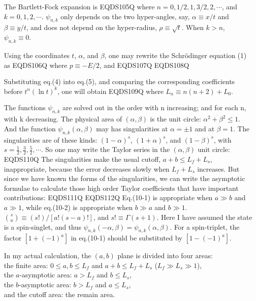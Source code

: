 \vspace{3mm}
The Bartlett-Fock expansion is
 EQDS105Q 
where $n=0, 1/2, 1, 3/2, 2, \cdots$, and $k=0, 1, 2, \cdots$.
$\psi_{n,k}$ only depends on the two hyper-angles, say,
$\alpha\equiv x/t$ and $\beta\equiv y/t$, and does not depend
on the hyper-radius, $\rho\equiv\sqrt{t}$. When $k>n$, 
$\psi_{n,k}\equiv 0$.

Using the coordinates $t$, $\alpha$, and $\beta$, one may rewrite
the Schr\"{o}dinger equation (1) as
 EQDS106Q 
where $p\equiv -E/2$, and
 EQDS107Q 
 EQDS108Q 

Substituting eq.(4) into eq.(5), and comparing the corresponding coefficients
before $t^{n}(\ln t)^k$, one will obtain
 EQDS109Q 
where $L_{n}\equiv n(n+2)+L_{0}$.

The functions $\psi_{n,k}$ are solved out in the order
with n increasing; and for each n, with k decreasing. The physical
area of $(\alpha, \beta)$ is the unit circle: $\alpha^{2}+\beta^{2}\le 1$.
And the function $\psi_{n,k}(\alpha,\beta)$ may has singularities at
$\alpha=\pm 1$ and at $\beta=1$. The singularities are of these kinds:
$(1-\alpha)^{s}$, $(1+\alpha)^{s}$, and $(1-\beta)^{s}$, with
$s=\frac{1}{2}, \frac{3}{2}, \frac{5}{2}, \cdots$. So one may write
the Taylor series in the $(\alpha,\beta)$ unit circle:
 EQDS110Q 
The singularities make the usual cutoff, $a+b\le L_f+L_s$, inappropriate, because
the error decreases slowly when $L_f+L_s$ increases.
But since we have known the forms of the singularities, we can write the
asymptotic formulae to calculate those high order Taylor coefficients that
have important contributions:
 EQDS111Q 
 EQDS112Q 
Eq.(10-1) is appropriate when $a\gg b$ and $a\gg 1$,
while eq.(10-2) is appropriate when $b\gg a$ and $b\gg 1$.
${s \choose a}\equiv(s!)/[a!(s-a)!]$, and $s!\equiv\Gamma(s+1)$.
Here I have assumed the state is a spin-singlet, and thus
$\psi_{n,k}(-\alpha,\beta)=\psi_{n,k}(\alpha,\beta)$. For a spin-triplet,
the factor $[1+(-1)^{a}]$ in eq.(10-1) should be substituted by
$[1-(-1)^{a}]$.

In my actual calculation, the $(a,b)$ plane is divided into four areas:\\
the finite area: $0\le a,b\le L_f$ and $a+b\le L_{f}+L_{s}$ ($L_f\gg L_s\gg 1$),\\
the $a$-asymptotic area: $a>L_{f}$ and $b\le L_s$,\\
the $b$-asymptotic area: $b>L_{f}$ and $a\le L_s$,\\
and the cutoff area: the remain area.

